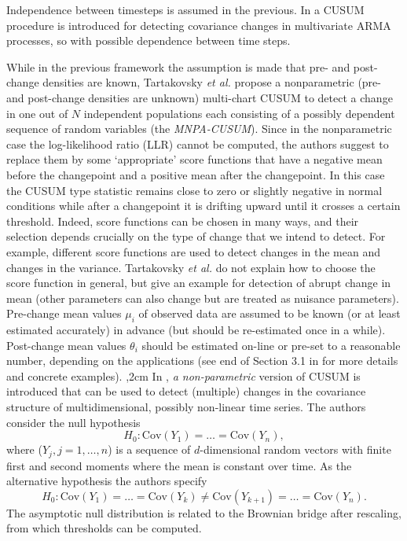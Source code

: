 \documentclass[conference,letterpaper]{IEEEtran}
\begin{document}
Independence between timesteps is assumed in the previous. In \cite{galeano2007covariance} a CUSUM procedure is introduced for detecting covariance changes in multivariate ARMA processes, so with possible dependence between time steps.
 
While in the previous framework the assumption is made that pre- and post-change densities are known, Tartakovsky \emph{et al.} \cite{TRS} propose a nonparametric (pre- and post-change densities are unknown) multi-chart CUSUM to  detect a change in one out of $N$ independent populations each consisting of a possibly dependent sequence of random variables (the \emph{MNPA-CUSUM}). 
Since in the nonparametric case the log-likelihood ratio (LLR) cannot be computed, the authors suggest to replace them by some `appropriate' score functions that have a negative mean before the changepoint and a positive mean after the changepoint. In this case the CUSUM type statistic remains close to zero or slightly negative in normal conditions while after a changepoint it is drifting upward until it crosses a certain threshold. Indeed, score functions can be chosen in many ways, and their selection depends crucially on the type of change that we intend to detect. For example, different score functions are used to detect changes in the mean and changes in the variance. Tartakovsky \emph{et al.} do not explain how to choose the score function in general, but give an example for detection of abrupt change in mean (other parameters can also change but are treated as nuisance parameters). Pre-change mean values $\mu_i$ of observed data are assumed to be known (or at least estimated accurately) in advance (but should be re-estimated once in a while). Post-change mean values $\theta_i$ should be estimated on-line or pre-set to a reasonable number, depending on the applications (see end of Section 3.1 in \cite{TRBK} for more details and concrete examples). ,2cm
In \cite{AUE}, \emph{a non-parametric} version of CUSUM is introduced that can be used to  detect (multiple) changes in the covariance structure of multidimensional, possibly non-linear time series. The authors consider the null hypothesis
$$H_0: \text{Cov}(Y_1)=\ldots=\text{Cov}(Y_n),$$
where ($Y_j,j=1,\ldots,n$) is a sequence of $d$-dimensional random vectors with finite first and second moments where the mean is constant over time. As the 
alternative hypothesis the authors specify
$$H_0: \text{Cov}(Y_1)=\ldots=\text{Cov}(Y_k)\neq \text{Cov}(Y_{k+1})=\ldots=\text{Cov}(Y_n).$$
The asymptotic null distribution is related to the Brownian bridge after rescaling, from which thresholds can be computed.
\end{document}
